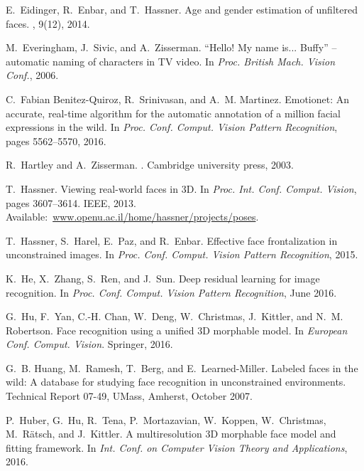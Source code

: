 \documentclass[a4paper, 10pt, conference]{ieeeconf}
\begin{document}
{\begin{thebibliography}{10}
E.~Eidinger, R.~Enbar, and T.~Hassner.
\newblock Age and gender estimation of unfiltered faces.
, 9(12), 2014.

M.~Everingham, J.~Sivic, and A.~Zisserman.
\newblock ``{H}ello! {M}y name is... {Buffy}'' -- automatic naming of
  characters in {TV} video.
\newblock In {\em Proc. British Mach. Vision Conf.}, 2006.

C.~Fabian Benitez-Quiroz, R.~Srinivasan, and A.~M. Martinez.
\newblock Emotionet: An accurate, real-time algorithm for the automatic
  annotation of a million facial expressions in the wild.
\newblock In {\em Proc. Conf. Comput. Vision Pattern Recognition}, pages
  5562--5570, 2016.

R.~Hartley and A.~Zisserman.
.
\newblock Cambridge university press, 2003.

T.~Hassner.
\newblock Viewing real-world faces in {3D}.
\newblock In {\em Proc. Int. Conf. Comput. Vision}, pages 3607--3614. IEEE,
  2013.
\newblock Available:~\url{www.openu.ac.il/home/hassner/projects/poses}.

T.~Hassner, S.~Harel, E.~Paz, and R.~Enbar.
\newblock Effective face frontalization in unconstrained images.
\newblock In {\em Proc. Conf. Comput. Vision Pattern Recognition}, 2015.

K.~He, X.~Zhang, S.~Ren, and J.~Sun.
\newblock Deep residual learning for image recognition.
\newblock In {\em Proc. Conf. Comput. Vision Pattern Recognition}, June 2016.

G.~Hu, F.~Yan, C.-H. Chan, W.~Deng, W.~Christmas, J.~Kittler, and N.~M.
  Robertson.
\newblock Face recognition using a unified {3D} morphable model.
\newblock In {\em European Conf. Comput. Vision}. Springer, 2016.

G.~B. Huang, M.~Ramesh, T.~Berg, and E.~Learned-Miller.
\newblock Labeled faces in the wild: A database for studying face recognition
  in unconstrained environments.
\newblock Technical Report 07-49, UMass, Amherst, October 2007.

P.~Huber, G.~Hu, R.~Tena, P.~Mortazavian, W.~Koppen, W.~Christmas, M.~Rätsch,
  and J.~Kittler.
\newblock A multiresolution {3D} morphable face model and fitting framework.
\newblock In {\em Int. Conf. on Computer Vision Theory and Applications}, 2016.


\end{thebibliography}}
\end{document}
